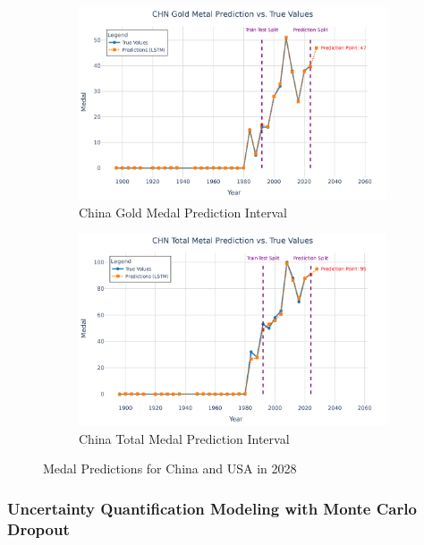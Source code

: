 \documentclass{mcmthesis}
\begin{document}
\begin{figure}[H]
	\begin{subfigure}[b]{0.48\textwidth}
		\includegraphics[width=\textwidth]{fig/CHN Gold Metal Prediction vs. True Values.png}
		\caption{China Gold Medal Prediction Interval}
		\label{fig:chn_gold1}
	\end{subfigure}
	\hfill
	\begin{subfigure}[b]{0.48\textwidth}
		\includegraphics[width=\textwidth]{fig/CHN Total Metal Prediction vs. True Values.png}
		\caption{China Total Medal Prediction Interval}
		\label{fig:chn_total1}
	\end{subfigure}
	
	\caption{Medal Predictions for China and USA in 2028}
	\label{all}
\end{figure}




\subsubsection{Uncertainty Quantification Modeling with Monte Carlo Dropout}
\end{document}
